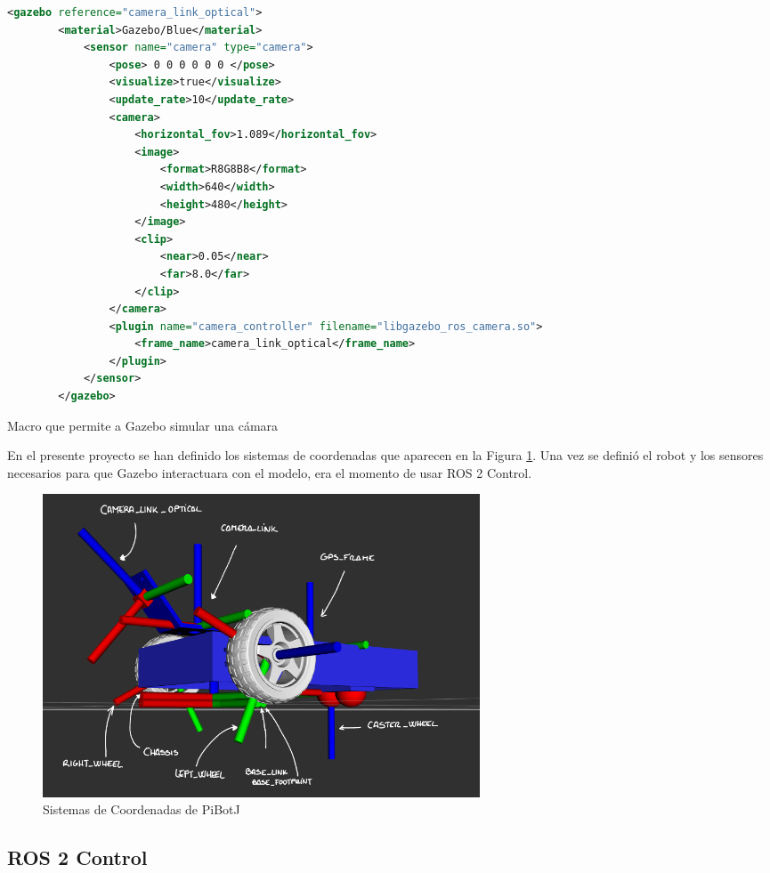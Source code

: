 \begin{code}[h]
	\begin{lstlisting}[language=xml]
		<gazebo reference="camera_link_optical">
		<material>Gazebo/Blue</material>
			<sensor name="camera" type="camera">
				<pose> 0 0 0 0 0 0 </pose>
				<visualize>true</visualize>
				<update_rate>10</update_rate>
				<camera>
					<horizontal_fov>1.089</horizontal_fov>
					<image>
						<format>R8G8B8</format>
						<width>640</width>
						<height>480</height>
					</image>
					<clip>
						<near>0.05</near>
						<far>8.0</far>
					</clip>
				</camera>
				<plugin name="camera_controller" filename="libgazebo_ros_camera.so">
					<frame_name>camera_link_optical</frame_name>
				</plugin>
			</sensor>
		</gazebo>
	\end{lstlisting}
	\caption[Macro que permite a Gazebo simular una cámara]{Macro que permite a Gazebo simular una cámara}
	\label{cod:gazebo}
\end{code}

En el presente proyecto se han definido los sistemas de coordenadas que aparecen en la Figura \ref{fig:links}. Una vez se definió el robot y los sensores necesarios para que Gazebo interactuara con el modelo, era el momento de usar ROS 2 Control. 

\begin{figure} [h!]
	\begin{center}
		\includegraphics[width=13cm]{figs/cap6/links.png}
	\end{center}
	\caption{Sistemas de Coordenadas de PiBotJ}
	\label{fig:links}
\end{figure}


\subsection{ROS 2 Control}
\label{subsec:cap6ros2control}

